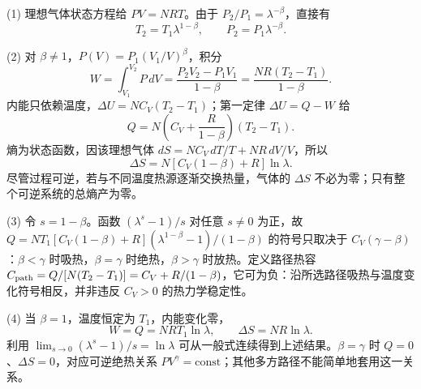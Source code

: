 (1) 理想气体状态方程给 \(PV=NRT\)。由于 \(P_2/P_1=\lambda^{-\beta}\)，直接有
\[
T_2=T_1\lambda^{1-\beta},\qquad P_2=P_1\lambda^{-\beta}.
\]

(2) 对 \(\beta\ne1\)，\(P(V)=P_1(V_1/V)^\beta\)，积分
\[
W=\int_{V_1}^{V_2}P\,dV
=\frac{P_2V_2-P_1V_1}{1-\beta}
=\frac{NR(T_2-T_1)}{1-\beta}.
\]
内能只依赖温度，\(\Delta U=NC_V(T_2-T_1)\)；第一定律 \(\Delta U=Q-W\) 给
\[
Q=N\left(C_V+\frac R{1-\beta}\right)(T_2-T_1).
\]
熵为状态函数，因该理想气体 \(dS=NC_V\,dT/T+NR\,dV/V\)，所以
\[
\Delta S=N[C_V(1-\beta)+R]\ln\lambda.
\]
尽管过程可逆，若与不同温度热源逐渐交换热量，气体的 \(\Delta S\) 不必为零；只有整个可逆系统的总熵产为零。

(3) 令 \(s=1-\beta\)。函数 \((\lambda^s-1)/s\) 对任意 \(s\ne0\) 为正，故 \(Q=NT_1[C_V(1-\beta)+R](\lambda^{1-\beta}-1)/(1-\beta)\) 的符号只取决于 \(C_V(\gamma-\beta)\)：\(\beta<\gamma\) 时吸热，\(\beta=\gamma\) 时绝热，\(\beta>\gamma\) 时放热。定义路径热容 \(C_{\rm path}=Q/[N(T_2-T_1)]=C_V+R/(1-\beta)\)，它可为负：沿所选路径吸热与温度变化符号相反，并非违反 \(C_V>0\) 的热力学稳定性。

(4) 当 \(\beta=1\)，温度恒定为 \(T_1\)，内能变化零，
\[
W=Q=NRT_1\ln\lambda,\qquad \Delta S=NR\ln\lambda.
\]
利用 \(\lim_{s\to0}(\lambda^s-1)/s=\ln\lambda\) 可从一般式连续得到上述结果。\(\beta=\gamma\) 时 \(Q=0\)、\(\Delta S=0\)，对应可逆绝热关系 \(PV^\gamma=\mathrm{const}\)；其他多方路径不能简单地套用这一关系。
